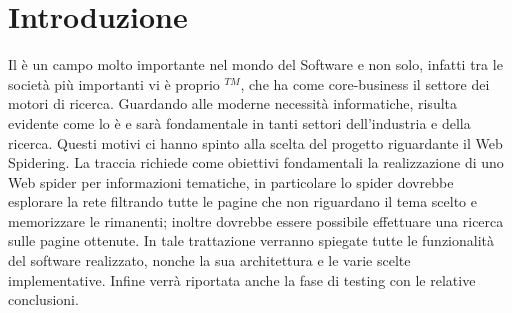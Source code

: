 \chapter{Introduzione}
Il  è un campo molto importante nel mondo del Software e non solo, infatti tra le società più importanti vi è proprio $^{TM}$, che ha come core-business il settore dei motori di ricerca. Guardando alle moderne necessità informatiche, risulta evidente come lo  è e sarà fondamentale in tanti settori dell'industria e della ricerca. Questi motivi ci hanno spinto alla scelta del progetto riguardante il Web Spidering. La traccia richiede come obiettivi fondamentali la realizzazione di uno Web spider per informazioni tematiche, in particolare lo spider dovrebbe esplorare la rete filtrando tutte le pagine che non riguardano il tema scelto e memorizzare le rimanenti; inoltre dovrebbe essere possibile effettuare una ricerca sulle pagine ottenute. In tale trattazione verranno spiegate tutte le funzionalità del software realizzato, nonche la sua architettura e le varie scelte implementative. Infine verrà riportata anche la fase di testing con le relative conclusioni.